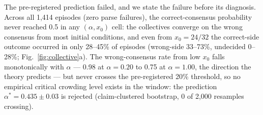 \documentclass[9pt,twocolumn]{extarticle}
\newcommand{\astar}{\alpha^{*}}
\begin{document}
The pre-registered prediction failed, and we state the failure before its
diagnosis. Across all 1{,}414 episodes (zero parse failures), the
correct-consensus probability never reached 0.5 in any $(\alpha, x_0)$ cell:
the collectives converge on the wrong consensus from most initial conditions,
and even from $x_0 = 24/32$ the correct-side outcome occurred in only
28--45\% of episodes (wrong-side 33--73\%, undecided 0--28\%;
Fig.~\ref{fig:collective}a). The
wrong-consensus rate from low $x_0$ falls monotonically with $\alpha$ --- 0.98
at $\alpha = 0.20$ to 0.75 at $\alpha = 1.00$, the direction the theory
predicts --- but never crosses the pre-registered 20\% threshold, so no
empirical critical crowding level exists in the window: the prediction
$\astar = 0.435 \pm 0.03$ is rejected (claim-clustered bootstrap, 0 of 2{,}000
resamples crossing).
\end{document}

